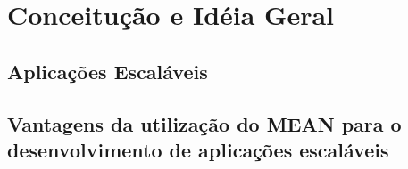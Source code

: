 \chapter{Conceitução e Idéia Geral}


\section{Aplicações Escaláveis}


\section{Vantagens da utilização do MEAN para o desenvolvimento de aplicações escaláveis}

